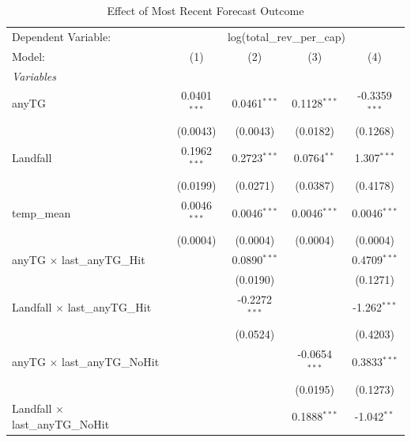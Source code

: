 \documentclass{article}
\begin{document}
\begin{table}[htbp]
   \caption{Effect of Most Recent Forecast Outcome}
   \centering
   \begin{tabular}{lcccc}
      \tabularnewline \midrule \midrule
      Dependent Variable: & \multicolumn{4}{c}{log(total\_rev\_per\_cap)}\\
      Model:                                  & (1)            & (2)             & (3)             & (4)\\  
      \midrule
      \emph{Variables}\\
      anyTG                                   & 0.0401$^{***}$ & 0.0461$^{***}$  & 0.1128$^{***}$  & -0.3359$^{***}$\\   
                                              & (0.0043)       & (0.0043)        & (0.0182)        & (0.1268)\\   
      Landfall                                & 0.1962$^{***}$ & 0.2723$^{***}$  & 0.0764$^{**}$   & 1.307$^{***}$\\   
                                              & (0.0199)       & (0.0271)        & (0.0387)        & (0.4178)\\   
      temp\_mean                              & 0.0046$^{***}$ & 0.0046$^{***}$  & 0.0046$^{***}$  & 0.0046$^{***}$\\   
                                              & (0.0004)       & (0.0004)        & (0.0004)        & (0.0004)\\   
      anyTG $\times$ last\_anyTG\_Hit         &                & 0.0890$^{***}$  &                 & 0.4709$^{***}$\\   
                                              &                & (0.0190)        &                 & (0.1271)\\   
      Landfall $\times$ last\_anyTG\_Hit      &                & -0.2272$^{***}$ &                 & -1.262$^{***}$\\   
                                              &                & (0.0524)        &                 & (0.4203)\\   
      anyTG $\times$ last\_anyTG\_NoHit       &                &                 & -0.0654$^{***}$ & 0.3833$^{***}$\\   
                                              &                &                 & (0.0195)        & (0.1273)\\   
      Landfall $\times$ last\_anyTG\_NoHit    &                &                 & 0.1888$^{***}$  & -1.042$^{**}$\\   

\end{tabular}
\end{table}
\end{document}

